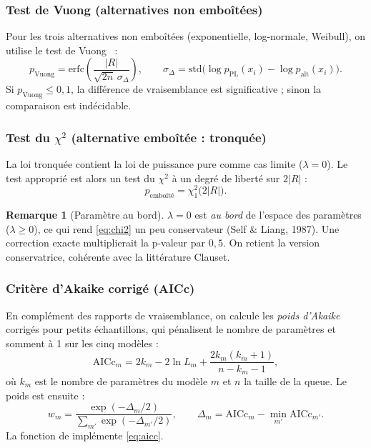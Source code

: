 \documentclass[11pt,a4paper]{article}
\theoremstyle{definition}
\newtheorem{remarque}{Remarque}
\newcommand{\code}[1]{\texttt{\detokenize{#1}}}
\newcommand{\dC}[1]{\texttt{\detokenize{#1}}}  %
\begin{document}
\subsubsection{Test de Vuong (alternatives non emboîtées)}

Pour les trois alternatives non emboîtées (exponentielle, log-normale, Weibull),
on utilise le test de Vuong~\cite{vuong1989} :
\begin{equation}
  p_{\text{Vuong}} = \mathrm{erfc}\!\left(
    \frac{|R|}{\sqrt{2n}\,\sigma_{\Delta}}
  \right),
  \qquad
  \sigma_{\Delta} = \mathrm{std}\bigl(\log p_{\text{PL}}(x_i) - \log p_{\text{alt}}(x_i)\bigr).
  \label{eq:vuong}
\end{equation}
Si $p_{\text{Vuong}} \leq 0{,}1$, la différence de vraisemblance est significative ;
sinon la comparaison est indécidable.

\subsubsection{Test du $\chi^2$ (alternative emboîtée : tronquée)}

La loi tronquée contient la loi de puissance pure comme cas limite
($\lambda = 0$). Le test approprié est alors un test du $\chi^2$ à un degré de
liberté sur $2|R|$ :
\begin{equation}
  p_{\text{emboîté}} = \chi^2_1\bigl(2|R|\bigr).
  \label{eq:chi2}
\end{equation}

\begin{remarque}[Paramètre au bord]
$\lambda = 0$ est \emph{au bord} de l'espace des paramètres ($\lambda \geq 0$),
ce qui rend \eqref{eq:chi2} un peu conservateur (Self \& Liang, 1987). Une
correction exacte multiplierait la p-valeur par $0{,}5$. On retient la version
conservatrice, cohérente avec la littérature Clauset.
\end{remarque}

\subsubsection{Critère d'Akaike corrigé (AICc)}

En complément des rapports de vraisemblance, on calcule les \emph{poids d'Akaike}
corrigés pour petits échantillons, qui pénalisent le nombre de paramètres et
somment à 1 sur les cinq modèles :
\begin{equation}
  \mathrm{AICc}_m = 2k_m - 2\ln L_m + \frac{2k_m(k_m + 1)}{n - k_m - 1},
  \label{eq:aicc}
\end{equation}
où $k_m$ est le nombre de paramètres du modèle $m$ et $n$ la taille de la queue.
Le poids est ensuite :
\[
  w_m = \frac{\exp(-\Delta_m/2)}{\sum_{m'} \exp(-\Delta_{m'}/2)},
  \qquad \Delta_m = \mathrm{AICc}_m - \min_{m'} \mathrm{AICc}_{m'}.
\]
La fonction \code{poids_aicc} de \dC{alternatives.py} implémente \eqref{eq:aicc}.
\end{document}
